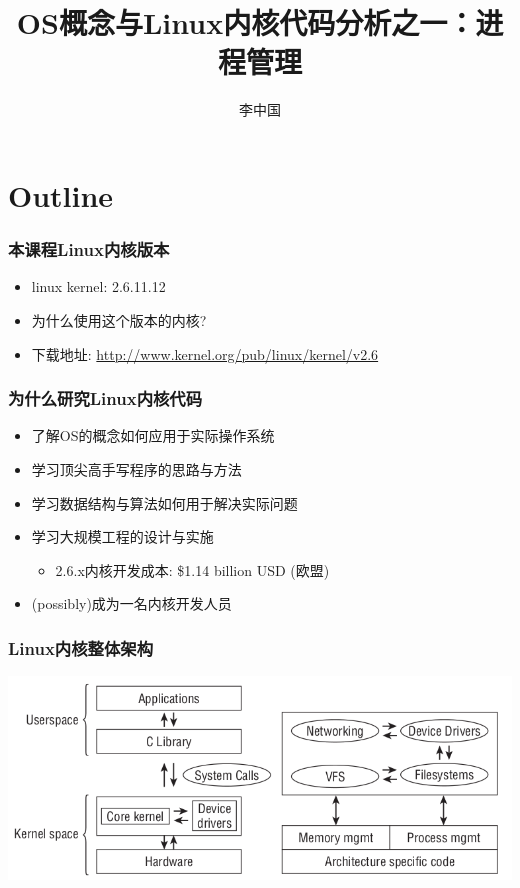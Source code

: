 \documentclass[xcolor=svgnames]{beamer}
\begin{document}
\begin{CJK*}{UTF8}{gbsn}


\title{OS概念与Linux内核代码分析之一：进程管理}
\author{李中国}

\begin{frame}
\maketitle
\end{frame}

\section{Outline}

\begin{frame}[fragile]
\frametitle{本课程Linux内核版本}
\begin{itemize}
\item linux kernel: 2.6.11.12 
\item 为什么使用这个版本的内核?
\item 下载地址: \url{http://www.kernel.org/pub/linux/kernel/v2.6}
\end{itemize}
\end{frame}

\begin{frame}[fragile]%
\frametitle{为什么研究Linux内核代码}
\begin{itemize}
\item 了解OS的概念如何应用于实际操作系统
\item 学习顶尖高手写程序的思路与方法
\item 学习数据结构与算法如何用于解决实际问题
\item 学习大规模工程的设计与实施
\begin{itemize}
\item 2.6.x内核开发成本: \$1.14 billion USD (欧盟)
\end{itemize}
\item (possibly)成为一名内核开发人员
\end{itemize}
\end{frame}

\begin{frame}[fragile]%
\frametitle{Linux内核整体架构}
\includegraphics[width=1.0\textwidth]{kernel.png}
\end{frame}


\end{CJK*}
\end{document}
